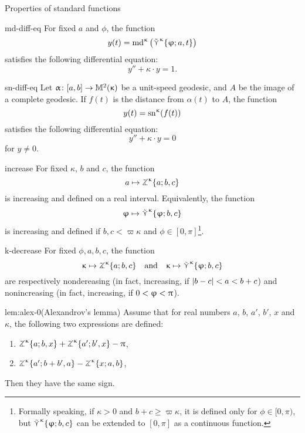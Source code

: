 \begin{thm}{Properties of standard functions}\label{md-equalities}

\begin{subthm}{md-diff-eq}
For fixed $a$ and $\phi$, the function 
\[y(t)=\mathrm{md}^{\upkappa}\left(\mathop{\tilde\curlyvee}\nolimits^{\upkappa}\{\upvarphi;a,t\}\right)\]
 satisfies the following differential equation:
\[y''+\kappa\cdot y=1.\]
\end{subthm}

\begin{subthm}{sn-diff-eq}
Let $\alpha\:[a,b]\to\Lob2\kappa$ be a unit-speed geodesic, and $A$ be the image of a complete geodesic.  If $f(t)$ is the distance from $\alpha(t)$ to $A$, the function 
\[y(t)=\mathrm{sn}^{\upkappa} (f(t))\]
 satisfies the following differential equation:
\[y''+\kappa\cdot y=0\]
for $y\ne 0$.
\end{subthm}

\begin{subthm}{increase}
For fixed $\kappa$, $b$ and $c$, the function 
\[a\mapsto\tangle\mc\kappa\{a;b,c\}\]
is increasing and defined on a real interval.
Equivalently, the function
\[\phi\mapsto\side\kappa \{\phi;b,c\}\]
is increasing and defined if $b,c<\varpi\kappa$ and $\phi\in[0,\pi]$\footnote{Formally speaking, if $\kappa>0$ and $b+c\ge \varpi\kappa$, it is defined only for $\phi\in[0,\pi)$, but $\mathop{\tilde\curlyvee}\nolimits^{\upkappa} \{\upvarphi;b,c\}$ can be extended to $[0,\pi]$ as a continuous function.}.
\end{subthm}

\begin{subthm}{k-decrease}
For fixed $\phi,a,b,c$, the function
\[\kappa\mapsto \tangle\mc\kappa\{a;b,c\}\quad \text{and}\quad \kappa\mapsto \side\kappa \{\phi;b,c\}\]
are respectively nondereasing (in fact, increasing, if $|b\z-c|\z<a\z< b+c$)
and nonincreasing (in fact, increasing, if $0\z<\phi\z<\pi$).
\end{subthm}

\begin{subthm}{lem:alex-0}(Alexandrov's lemma)
Assume that for real numbers $a$, $b$, $a'$, $b'$, $x$ and $\kappa$, the following two expressions are defined:
\begin{enumerate}
\item $\tangle\mc\kappa\{a;b,x\}+\tangle\mc\kappa\{a';b',x\}-\pi$,
\item $\tangle\mc\kappa\{a';b+b',a\}-\tangle\mc\kappa\{x;a,b\}$,
\end{enumerate}
Then they have the same sign.
\end{subthm}
\end{thm}


